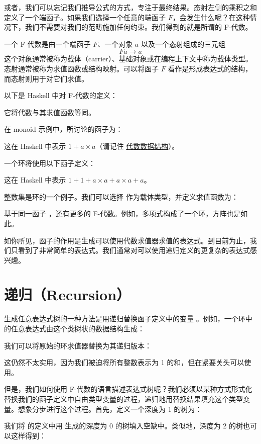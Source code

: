 或者，我们可以忘记我们推导公式的方式，专注于最终结果。态射左侧的乘积之和定义了一个端函子。如果我们选择一个任意的端函子 $F$，会发生什么呢？在这种情况下，我们不需要对我们的范畴施加任何约束。我们得到的就是所谓的 F-代数。

一个 F-代数是由一个端函子 $F$、一个对象 $a$ 以及一个态射组成的三元组
\[F a \to a\]
这个对象通常被称为载体（carrier）、基础对象或在编程上下文中称为载体类型。态射通常被称为求值函数或结构映射。可以将函子 $F$ 看作是形成表达式的结构，而态射则用于对它们求值。

以下是 Haskell 中对 F-代数的定义：

它将代数与其求值函数等同。

在 monoid 示例中，所讨论的函子为：

这在 Haskell 中表示 $1 + a\times{}a$（请记住 \hyperref[simple-algebraic-data-types]{代数数据结构}）。

一个环将使用以下函子定义：

这在 Haskell 中表示 $1 + 1 + a\times{}a + a\times{}a + a$。

整数集是环的一个例子。我们可以选择  作为载体类型，并定义求值函数为：

基于同一函子 ，还有更多的 F-代数。例如，多项式构成了一个环，方阵也是如此。

如你所见，函子的作用是生成可以使用代数求值器求值的表达式。到目前为止，我们只看到了非常简单的表达式。我们通常对可以使用递归定义的更复杂的表达式感兴趣。

\section{递归（Recursion）}

生成任意表达式树的一种方法是用递归替换函子定义中的变量 。例如，一个环中的任意表达式由这个类树状的数据结构生成：

我们可以将原始的环求值器替换为其递归版本：

这仍然不太实用，因为我们被迫将所有整数表示为 1 的和，但在紧要关头可以使用。

但是，我们如何使用 F-代数的语言描述表达式树呢？我们必须以某种方式形式化替换我们的函子定义中自由类型变量的过程，递归地用替换结果填充这个类型变量。想象分步进行这个过程。首先，定义一个深度为 1 的树为：

我们将  的定义中用  生成的深度为 0 的树填入空缺中。类似地，深度为 2 的树也可以这样得到：

